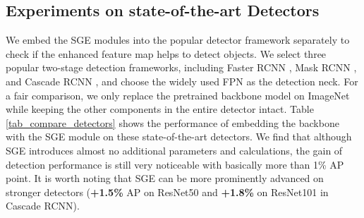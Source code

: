\documentclass{article}
\begin{document}
	\subsection{Experiments on state-of-the-art Detectors}
	We embed the SGE modules into the popular detector framework separately to check if the enhanced feature map helps to detect objects. We select three popular two-stage detection frameworks, including Faster RCNN \cite{ren2015faster}, Mask RCNN \cite{he2017mask}, and Cascade RCNN \cite{cai2018cascade}, and choose the widely used FPN \cite{lin2017feature} as the detection neck. For a fair comparison, we only replace the pretrained backbone model on ImageNet while keeping the other components in the entire detector intact. Table \ref{tab_compare_detectors} shows the performance of embedding the backbone with the SGE module on these state-of-the-art detectors. We find that although SGE introduces almost no additional parameters and calculations, the gain of detection performance is still very noticeable with basically more than 1\% AP point. It is worth noting that SGE can be more prominently advanced on stronger detectors (\textbf{+1.5\%} AP on ResNet50 and \textbf{+1.8\%} on ResNet101 in Cascade RCNN).
\end{document}
